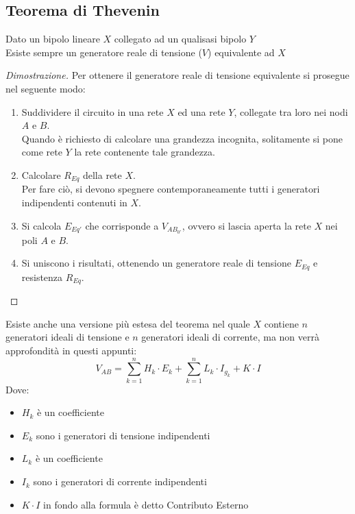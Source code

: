 \documentclass[../main.tex]{subfiles}
\begin{document}
	\subsection{Teorema di Thevenin}
	\begin{theorem}
		Dato un bipolo lineare $X$ collegato ad un qualisasi bipolo $Y$\\
		Esiste sempre un generatore reale di tensione ($V$) equivalente ad $X$
	\end{theorem}
	\begin{proof}[Dimostrazione]
		Per ottenere il generatore reale di tensione equivalente si prosegue nel seguente modo:
		\begin{enumerate}
			\item Suddividere il circuito in una rete $X$ ed una rete $Y$, collegate tra loro nei nodi $A$ e $B$.\\
			Quando è richiesto di calcolare una grandezza incognita, solitamente si pone come rete $Y$ la rete contenente tale grandezza.
			\item Calcolare $R_{Eq}$ della rete $X$.\\
			Per fare ciò, si devono spegnere contemporaneamente tutti i generatori indipendenti contenuti in $X$.
			\item Si calcola $E_{Eq'}$ che corrisponde a $V_{AB_{0'}}$, ovvero si lascia aperta la rete $X$ nei poli $A$ e $B$.
			\item Si uniscono i risultati, ottenendo un generatore reale di tensione $E_{Eq}$ e resistenza $R_{Eq}$.
		\end{enumerate}
	\end{proof}
	Esiste anche una versione più estesa del teorema nel quale $X$ contiene $n$ generatori ideali di tensione e $n$ generatori ideali di corrente, ma non verrà approfondità in questi appunti:
	\begin{equation}
		V_{AB} = \sum_{k=1}^{n} H_k \cdot E_k + \sum_{k=1}^{n} L_k \cdot I_{g_k} + K \cdot I
	\end{equation}
	Dove:
	\begin{itemize}
		\item $H_k$ è un coefficiente
		\item $E_k$ sono i generatori di tensione indipendenti
		\item $L_k$ è un coefficiente
		\item $I_k$ sono i generatori di corrente indipendenti
		\item $K \cdot I$ in fondo alla formula è detto Contributo Esterno
	\end{itemize}
\end{document}
